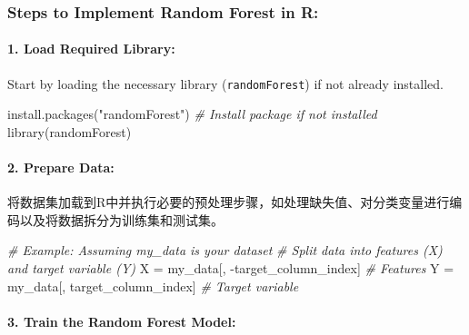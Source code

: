 \documentclass[
]{article}
\newenvironment{Shaded}{}{}
\newcommand{\CommentTok}[1]{\textcolor[rgb]{0.38,0.63,0.69}{\textit{#1}}}
\newcommand{\FunctionTok}[1]{\textcolor[rgb]{0.02,0.16,0.49}{#1}}
\newcommand{\NormalTok}[1]{#1}
\newcommand{\OtherTok}[1]{\textcolor[rgb]{0.00,0.44,0.13}{#1}}
\newcommand{\SpecialCharTok}[1]{\textcolor[rgb]{0.25,0.44,0.63}{#1}}
\newcommand{\StringTok}[1]{\textcolor[rgb]{0.25,0.44,0.63}{#1}}
\begin{document}
\hypertarget{steps-to-implement-random-forest-in-r}{%
\subsubsection{Steps to Implement Random Forest in
R:}\label{steps-to-implement-random-forest-in-r}}

\hypertarget{1-load-required-library}{%
\paragraph{\texorpdfstring{1. \textbf{Load Required
Library:}}{1. Load Required Library:}}\label{1-load-required-library}}

Start by loading the necessary library (\texttt{randomForest}) if not
already installed.

\begin{Shaded}
\begin{Highlighting}[]
\FunctionTok{install.packages}\NormalTok{(}\StringTok{"randomForest"}\NormalTok{)  }\CommentTok{\# Install package if not installed}
\FunctionTok{library}\NormalTok{(randomForest)}
\end{Highlighting}
\end{Shaded}

\hypertarget{2-prepare-data}{%
\paragraph{\texorpdfstring{2. \textbf{Prepare
Data:}}{2. Prepare Data:}}\label{2-prepare-data}}

将数据集加载到R中并执行必要的预处理步骤，如处理缺失值、对分类变量进行编码以及将数据拆分为训练集和测试集。

\begin{Shaded}
\begin{Highlighting}[]
\CommentTok{\# Example: Assuming \textquotesingle{}my\_data\textquotesingle{} is your dataset}
\CommentTok{\# Split data into features (X) and target variable (Y)}
\NormalTok{X }\OtherTok{=}\NormalTok{ my\_data[, }\SpecialCharTok{{-}}\NormalTok{target\_column\_index]  }\CommentTok{\# Features}
\NormalTok{Y }\OtherTok{=}\NormalTok{ my\_data[, target\_column\_index]   }\CommentTok{\# Target variable}
\end{Highlighting}
\end{Shaded}

\hypertarget{3-train-the-random-forest-model}{%
\paragraph{\texorpdfstring{3. \textbf{Train the Random Forest
Model:}}{3. Train the Random Forest Model:}}\label{3-train-the-random-forest-model}}
\end{document}
